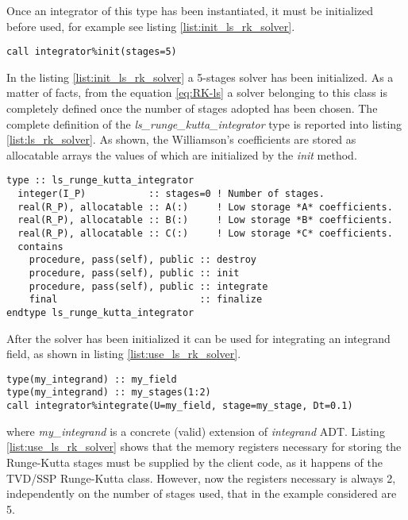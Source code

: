 Once an integrator of this type has been instantiated, it must be initialized before used, for example see listing \ref{list:init_ls_rk_solver}.

\begin{lstlisting}[firstnumber=1,style=code,caption={example of initialization of an explicit low storage Runge-Kutta integrator},label={list:init_ls_rk_solver}]
call integrator%init(stages=5)
\end{lstlisting}

In the listing \ref{list:init_ls_rk_solver} a 5-stages solver has been initialized. As a matter of facts, from the equation \ref{eq:RK-ls} a solver belonging to this class is completely defined once the number of stages adopted has been chosen. The complete definition of the \emph{ls\_runge\_kutta\_integrator} type is reported into listing \ref{list:ls_rk_solver}. As shown, the Williamson's coefficients are stored as allocatable arrays the values of which are initialized by the \emph{init} method.

\begin{lstlisting}[firstnumber=1,style=code,caption={definition of \emph{ls\_runge\_kutta\_integrator} type},label={list:ls_rk_solver}]
type :: ls_runge_kutta_integrator
  integer(I_P)           :: stages=0 ! Number of stages.
  real(R_P), allocatable :: A(:)     ! Low storage *A* coefficients.
  real(R_P), allocatable :: B(:)     ! Low storage *B* coefficients.
  real(R_P), allocatable :: C(:)     ! Low storage *C* coefficients.
  contains
    procedure, pass(self), public :: destroy
    procedure, pass(self), public :: init
    procedure, pass(self), public :: integrate
    final                         :: finalize
endtype ls_runge_kutta_integrator
\end{lstlisting}

After the solver has been initialized it can be used for integrating an integrand field, as shown in listing \ref{list:use_ls_rk_solver}.

\begin{lstlisting}[firstnumber=1,style=code,caption={example of usage of a low storage Runge-Kutta integrator},label={list:use_ls_rk_solver}]
type(my_integrand) :: my_field
type(my_integrand) :: my_stages(1:2)
call integrator%integrate(U=my_field, stage=my_stage, Dt=0.1)
\end{lstlisting}
where \emph{my\_integrand} is a concrete (valid) extension of \emph{integrand} ADT. Listing \ref{list:use_ls_rk_solver} shows that the memory registers necessary for storing the Runge-Kutta stages must be supplied by the client code, as it happens of the TVD/SSP Runge-Kutta class. However, now the registers necessary is always 2, independently on the number of stages used, that in the example considered are 5.

